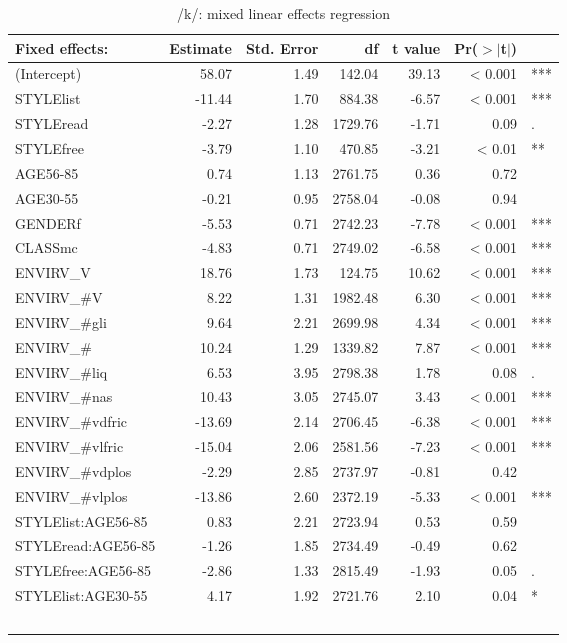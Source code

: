 {\footnotesize
	\begin{longtable}[c]{p{}rrrrrl}
				\caption{/k/: mixed linear effects regression}\label{tab.regression.k}\\
		\hline
		Fixed effects: & Estimate & Std. Error & df & t value & Pr($>$$|$t$|$) & \\
		\hline
		(Intercept) & 58.07 & 1.49 & 142.04 & 39.13 & < 0.001 & *** \\ 
		STYLElist & -11.44 & 1.70 & 884.38 & -6.57 & < 0.001 & *** \\ 
		STYLEread & -2.27 & 1.28 & 1729.76 & -1.71 & 0.09 & . \\ 
		STYLEfree & -3.79 & 1.10 & 470.85 & -3.21 & < 0.01 & ** \\ 
		AGE56-85 & 0.74 & 1.13 & 2761.75 & 0.36 & 0.72 & \\ 
		AGE30-55 & -0.21 & 0.95 & 2758.04 & -0.08 & 0.94 & \\ 
		GENDERf & -5.53 & 0.71 & 2742.23 & -7.78 & < 0.001 & *** \\ 
		CLASSmc & -4.83 & 0.71 & 2749.02 & -6.58 & < 0.001 & *** \\ 
		ENVIRV\_V & 18.76 & 1.73 & 124.75 & 10.62 & < 0.001 & *** \\ 
		ENVIRV\_\#V & 8.22 & 1.31 & 1982.48 & 6.30 & < 0.001 & *** \\ 
		ENVIRV\_\#gli & 9.64 & 2.21 & 2699.98 & 4.34 & < 0.001 & *** \\ 
		ENVIRV\_\# & 10.24 & 1.29 & 1339.82 & 7.87 & < 0.001 & *** \\ 
		ENVIRV\_\#liq & 6.53 & 3.95 & 2798.38 & 1.78 & 0.08 & . \\ 
		ENVIRV\_\#nas & 10.43 & 3.05 & 2745.07 & 3.43 & < 0.001 & *** \\ 
		ENVIRV\_\#vdfric & -13.69 & 2.14 & 2706.45 & -6.38 & < 0.001 & *** \\ 
		ENVIRV\_\#vlfric & -15.04 & 2.06 & 2581.56 & -7.23 & < 0.001 & *** \\ 
		ENVIRV\_\#vdplos & -2.29 & 2.85 & 2737.97 & -0.81 & 0.42 & \\ 
		ENVIRV\_\#vlplos & -13.86 & 2.60 & 2372.19 & -5.33 & < 0.001 & *** \\ 
		STYLElist:AGE56-85 & 0.83 & 2.21 & 2723.94 & 0.53 & 0.59 & \\ 
		STYLEread:AGE56-85 & -1.26 & 1.85 & 2734.49 & -0.49 & 0.62 & \\ 
		STYLEfree:AGE56-85 & -2.86 & 1.33 & 2815.49 & -1.93 & 0.05 & . \\ 
		STYLElist:AGE30-55 & 4.17 & 1.92 & 2721.76 & 2.10 & 0.04 & * \\ 
$$
\end{longtable}}
